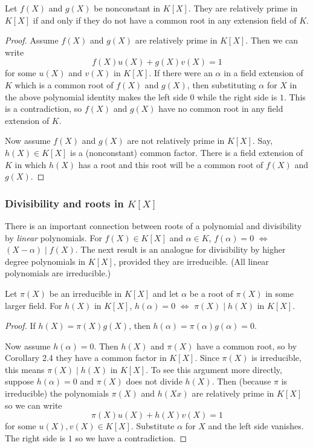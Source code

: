 \begin{corollary}
  Let $f(X)$ and $g(X)$ be nonconstant in $K[X]$. They are relatively prime
  in $K[X]$ if and only if they do not have a common root in any extension
  field of $K$.
\end{corollary}
\begin{proof}
  Assume $f(X)$ and $g(X)$ are relatively prime in $K[X]$. Then we can
  write
  \[
    f(X)u(X)+g(X)v(X)=1
  \]
  for some $u(X)$ and $v(X)$ in $K[X]$. If there were an $\alpha$ in a
  field extension of $K$ which is a common root of $f(X)$ and $g(X)$, then
  substituting $\alpha$ for $X$ in the above polynomial identity makes the
  left side $0$ while the right side is $1$. This is a contradiction, so
  $f(X)$ and $g(X)$ have no common root in any field extension of $K$.

  Now assume $f(X)$ and $g(X)$ are not relatively prime in $K[X]$. Say,
  $h(X)\in K[X]$ is a (nonconstant) common factor. There is a field
  extension of $K$ in which $h(X)$ has a root and this root will be a
  common root of $f(X)$ and $g(X)$.
\end{proof}

\subsubsection[Divisibility and roots in KX]{Divisibility and roots in
  $K[X]$}
There is an important connection between roots of a polynomial and
divisibility by \emph{linear} polynomials. For $f(X)\in K[X]$ and
$\alpha\in K$, $f(\alpha)=0$ $\iff$ $(X-\alpha)\mid f(X)$. The next result
is an analogue for divisibility by higher degree polynomials in $K[X]$,
provided they are irreducible. (All linear polynomials are irreducible.)

\begin{theorem}
  Let $\pi(X)$ be an irreducible in $K[X]$ and let $\alpha$ be a root of
  $\pi(X)$ in some larger field. For $h(X)$ in $K[X]$, $h(\alpha)=0$ $\iff$
  $\pi(X)\mid h(X)$ in $K[X]$.
\end{theorem}
\begin{proof}
  If $h(X)=\pi(X)g(X)$, then $h(\alpha)=\pi(\alpha)g(\alpha)=0$.

  Now assume $h(\alpha)=0$. Then $h(X)$ and $\pi(X)$ have a common root, so
  by Corollary 2.4 they have a common factor in $K[X]$. Since $\pi(X)$ is
  irreducible, this means $\pi(X)\mid h(X)$ in $K[X]$. To see this argument
  more directly, suppose $h(\alpha)=0$ and $\pi(X)$ does not divide
  $h(X)$. Then (because $\pi$ is irreducible) the polynomials $\pi(X)$ and
  $h(Xx)$ are relatively prime in $K[X]$ so we can write
  \[
    \pi(X)u(X)+h(X)v(X)=1
  \]
  for some $u(X),v(X)\in K[X]$. Substitute $\alpha$ for $X$ and the left
  side vanishes. The right side is $1$ so we have a contradiction.
\end{proof}

